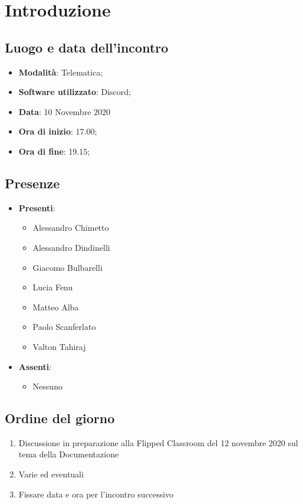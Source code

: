 \documentclass[]{article}
\begin{document}
	
	
	
	\newpage
	
	\section{Introduzione}
\subsection{Luogo e data dell'incontro}
\begin{itemize}
	\item \textbf{Modalità}: Telematica;
	\item \textbf{Software utilizzato}: Discord;
	\item \textbf{Data}: 10 Novembre 2020
	\item \textbf{Ora di inizio}: 17.00;
	\item \textbf{Ora di fine}: 19.15;
\end{itemize}

\subsection{Presenze}
\begin{itemize}
	\item \textbf{Presenti}: 
	\begin{itemize}
		\item Alessandro Chimetto
		\item Alessandro Dindinelli
		\item Giacomo Bulbarelli
		\item Lucia Fenu
		\item Matteo Alba
		\item Paolo Scanferlato
		\item Valton Tahiraj
	\end{itemize}
	\item \textbf{Assenti}:
	\begin{itemize}
		\item Nessuno
	\end{itemize}
\end{itemize}


\subsection{Ordine del giorno}
\begin{enumerate}
	\item Discussione in preparazione alla Flipped Classroom del 12 novembre 2020 sul tema della Documentazione
	\item Varie ed eventuali
	\item Fissare data e ora per l'incontro successivo
\end{enumerate}
\end{document}
